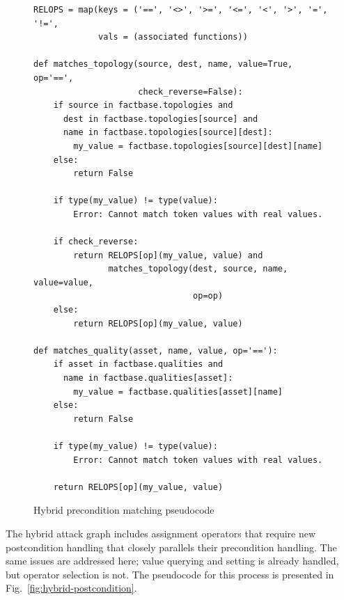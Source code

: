 \begin{figure}
\begin{lstlisting}
RELOPS = map(keys = ('==', '<>', '>=', '<=', '<', '>', '=', '!=',
             vals = (associated functions))
             
def matches_topology(source, dest, name, value=True, op='==',
                     check_reverse=False):
    if source in factbase.topologies and
      dest in factbase.topologies[source] and
      name in factbase.topologies[source][dest]:
        my_value = factbase.topologies[source][dest][name]
    else:
        return False

    if type(my_value) != type(value):
        Error: Cannot match token values with real values.
    
    if check_reverse:
        return RELOPS[op](my_value, value) and
               matches_topology(dest, source, name, value=value,
                                op=op)
    else:
        return RELOPS[op](my_value, value)

def matches_quality(asset, name, value, op='=='):
    if asset in factbase.qualities and
      name in factbase.qualities[asset]:
        my_value = factbase.qualities[asset][name]
    else:
        return False
    
    if type(my_value) != type(value):
        Error: Cannot match token values with real values.
    
    return RELOPS[op](my_value, value)
\end{lstlisting}
\caption{Hybrid precondition matching pseudocode}
\label{fig:hybrid-matching}
\end{figure}
The hybrid attack graph includes assignment operators that require new
postcondition handling that closely parallels their precondition handling.
The same issues are addressed here; value querying and setting is already
handled, but operator selection is not. The pseudocode for this process is
presented in Fig.~\ref{fig:hybrid-postcondition}.

